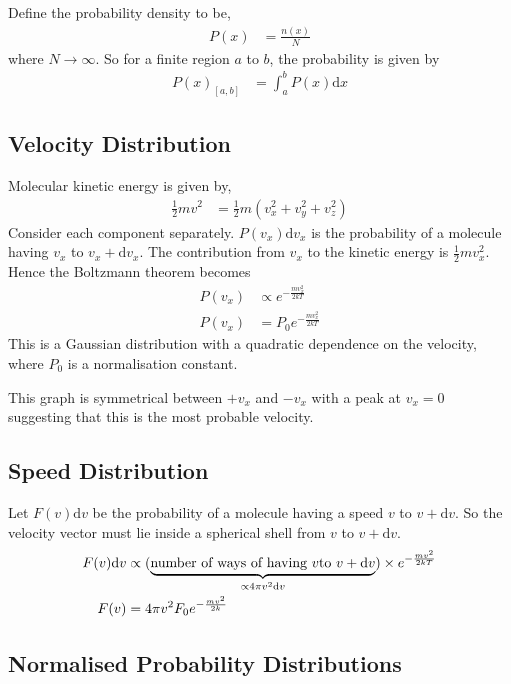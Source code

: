 \documentclass[british]{article}
\renewcommand{\d}{\mathrm{d}} %
\begin{document}
Define the probability density to be, 
\begin{align*}
P(x) & =\frac{n(x)}{N}
\end{align*}
where $N\rightarrow\infty$. So for a finite region $a$ to $b$, the probability is given by 
\begin{align*}
P(x)_{[a,b]} & =\int_{a}^{b}P(x)\d{x}
\end{align*}


\subsection{Velocity Distribution}

Molecular kinetic energy is given by, 
\begin{align*}
\frac{1}{2}mv^{2} & =\frac{1}{2}m(v_{x}^{2}+v_{y}^{2}+v_{z}^{2})
\end{align*}
Consider each component separately. $P(v_{x})\d{v_{x}}$ is the probability of a molecule having $v_{x}$ to $v_{x}+\d{v_{x}}$. The contribution from $v_{x}$ to the kinetic energy is $\frac{1}{2}mv_{x}^{2}$. Hence the Boltzmann theorem becomes 
\begin{align*}
P(v_{x}) & \propto e^{-\frac{mv_{x}^{2}}{2kT}}\\
P(v_{x}) & =P_{0}e^{-\frac{mv_{x}^{2}}{2kT}}
\end{align*}
This is a Gaussian distribution with a quadratic dependence on the velocity, where $P_{0}$ is a normalisation constant.

This graph is symmetrical between $+v_{x}$ and $-v_{x}$ with a peak at $v_{x}=0$ suggesting that this is the most probable velocity.

\subsection{Speed Distribution}

Let $F(v)\d{v}$ be the probability of a molecule having a speed $v$ to $v+\d{v}$. So the velocity vector must lie inside a spherical shell from $v$ to $v+\d{v}$. 
\begin{align*}
F(v)\d{v} & \propto(\underbrace{\text{number of ways of having \ensuremath{v}to \ensuremath{v+\d{v}}}}_{\propto4\pi v^{2}\d{v}})\times e^{-\frac{mv^{2}}{2kT}}\\
F(v) & =4\pi v^{2}F_{0}e^{-\frac{mv^{2}}{2k}}
\end{align*}


\subsection{Normalised Probability Distributions}
\end{document}
